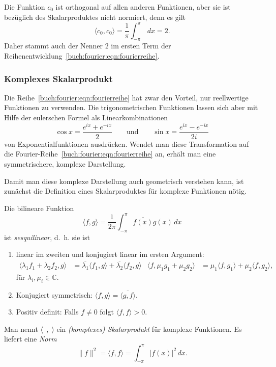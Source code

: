 Die Funktion $c_0$ ist orthogonal auf allen anderen Funktionen,
aber sie ist bezüglich des Skalarproduktes nicht normiert, denn
es gilt
\[
\langle c_0,c_0\rangle
=
\frac{1}{\pi}
\int_{-\pi}^\pi
\,dx
=
2.
\]
Daher stammt auch der Nenner $2$ im ersten Term der
Reihenentwicklung~\eqref{buch:fourier:eqn:fourierreihe}.

%
%
\subsubsection{Komplexes Skalarprodukt}
Die Reihe~\eqref{buch:fourier:eqn:fourierreihe} hat zwar den Vorteil,
nur reellwertige Funktionen zu verwenden.
Die trigonometrischen Funktionen lassen sich aber mit Hilfe der
eulerschen Formel als Linearkombinationen
\[
\cos x = \frac{e^{ix}+e^{-ix}}{2}
\qquad
\text{und}
\qquad
\sin x = \frac{e^{ix}-e^{-ix}}{2i}
\]
von Exponentialfunktionen ausdrücken.
Wendet man diese Transformation auf
die Fourier-Reihe~\eqref{buch:fourier:eqn:fourierreihe}
an, erhält man eine symmetrischere, komplexe Darstellung.

Damit man diese komplexe Darstellung auch geometrisch verstehen
kann, ist zunächst die Definition eines Skalarproduktes für komplexe
Funktionen nötig.

\begin{definition}
\label{buch:fourier:def:cskalar}
Die bilineare Funktion
%
\[
\langle f,g\rangle
=
\frac{1}{2\pi}
\int_{-\pi}^\pi \overline{f(x)}g(x)\,dx
\]
ist {\em sesquilinear}, d.~h. sie ist
%
\begin{enumerate}
\item
linear im zweiten und konjugiert linear im ersten Argument:
%
\begin{align*}
\langle\lambda_1f_1+\lambda_2f_2,g\rangle
&=
\overline{\lambda_1}\langle f_1,g\rangle
+
\overline{\lambda_2}\langle f_2,g\rangle
&
\langle f,\mu_1g_1+\mu_2g_2\rangle
&=
\mu_1
\langle f,g_1\rangle
+
\mu_2
\langle f,g_2\rangle,
\end{align*}
für $\lambda_i,\mu_i\in\mathbb{C}$.
\item
Konjugiert symmetrisch:
%
$\langle f,g\rangle=\overline{\langle g,f\rangle}$.
\item
Positiv definit: Falls $f\ne 0$ folgt
%
$\langle f,f\rangle > 0$.
\end{enumerate}
Man nennt
$\langle\;\,,\;\rangle$
ein {\em (komplexes) Skalarprodukt} für komplexe Funktionen.
%
%
Es liefert eine
{\em Norm}
%
\begin{equation}
\|f\|^2
=
\langle f,f\rangle
=
\int_{-\pi}^{\pi} |f(x)|^2\,dx.
\label{buch:fourier:def:norm}
\end{equation}
\end{definition}

